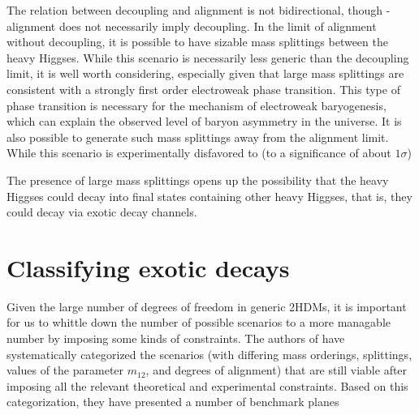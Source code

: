 The relation between decoupling and alignment is not bidirectional, though - alignment does not necessarily imply decoupling. In the limit of alignment without decoupling, it is possible to have sizable mass splittings between the heavy Higgses. While this scenario is necessarily less generic than the decoupling limit, it is well worth considering, especially given that large mass splittings are consistent with a strongly first order electroweak phase transition. This type of phase transition is necessary for the mechanism of electroweak baryogenesis, which can explain the observed level of baryon asymmetry in the universe. It is also possible to generate such mass splittings away from the alignment limit. While this scenario is experimentally disfavored to \cite{Aad:2015pla} (to a significance of about $1\sigma$)

The presence of large mass splittings opens up the possibility that the heavy Higgses could decay into final states containing other heavy Higgses, that is, they could decay via exotic decay channels.

\section{Classifying exotic decays}
Given the large number of degrees of freedom in generic 2HDMs, it is important for us to whittle down the number of possible scenarios to a more managable number by imposing some kinds of constraints. The authors of \cite{Kling2016} have systematically categorized the scenarios (with differing mass orderings, splittings, values of the parameter $m_{12}$, and degrees of alignment) that are still viable after imposing all the relevant theoretical and experimental constraints. Based on this categorization, they have presented a number of benchmark planes 


